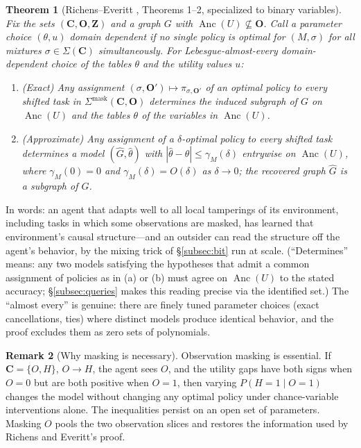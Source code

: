 \documentclass[11pt]{amsart}
\theoremstyle{plain}
\newtheorem{theorem}{Theorem}[section]
\theoremstyle{definition}
\newtheorem{remark}[theorem]{Remark}
\DeclareMathOperator{\Anc}{Anc}
\newcommand{\bC}{\mathbf{C}}
\newcommand{\bO}{\mathbf{O}}
\newcommand{\bZ}{\mathbf{Z}}
\begin{document}
\begin{theorem}[Richens--Everitt \cite{richens2024}, Theorems 1--2, specialized to binary variables]\label{thm:re}
Fix the sets $(\bC,\bO,\bZ)$ and a graph $G$ with $\Anc(U)\not\subseteq\bO$. Call a parameter choice $(\theta,u)$ \emph{domain dependent} \cite[Assumption~2]{richens2024} if no single policy is optimal for $(M,\sigma)$ for all mixtures $\sigma\in\Sigma(\bC)$ simultaneously. For Lebesgue-almost-every domain-dependent choice of the tables $\theta$ and the utility values $u$:
\begin{enumerate}
\item[(a)] (\emph{Exact}) Any assignment $(\sigma,\bO')\mapsto\pi_{\sigma,\bO'}$ of an optimal policy to every shifted task in $\Sigma^\mathrm{mask}(\bC,\bO)$ determines the induced subgraph of $G$ on $\Anc(U)$ and the tables $\theta$ of the variables in $\Anc(U)$.
\item[(b)] (\emph{Approximate}) Any assignment of a $\delta$-optimal policy to every shifted task determines a model $(\widehat G,\widehat\theta)$ with $|\widehat\theta-\theta|\le\gamma_M(\delta)$ entrywise on $\Anc(U)$, where $\gamma_M(0)=0$ and $\gamma_M(\delta)=O(\delta)$ as $\delta\to0$; the recovered graph $\widehat G$ is a subgraph of $G$.
\end{enumerate}
\end{theorem}

In words: an agent that adapts well to all local tamperings of its environment, including tasks in which some observations are masked, has learned that environment's causal structure---and an outsider can read the structure off the agent's behavior, by the mixing trick of \S\ref{subsec:bit} run at scale. (``Determines'' means: any two models satisfying the hypotheses that admit a common assignment of policies as in (a) or (b) must agree on $\Anc(U)$ to the stated accuracy; \S\ref{subsec:queries} makes this reading precise via the identified set.) The ``almost every'' is genuine: there are finely tuned parameter choices (exact cancellations, ties) where distinct models produce identical behavior, and the proof excludes them as zero sets of polynomials.

\begin{remark}[Why masking is necessary]\label{rem:mask-audit}
Observation masking is essential. If $\bC=\{O,H\}$, $O\to H$, the agent sees $O$, and the utility gaps have both signs when $O=0$ but are both positive when $O=1$, then varying $P(H=1\mid O=1)$ changes the model without changing any optimal policy under chance-variable interventions alone. The inequalities persist on an open set of parameters. Masking $O$ pools the two observation slices and restores the information used by Richens and Everitt's proof.
\end{remark}
\end{document}
